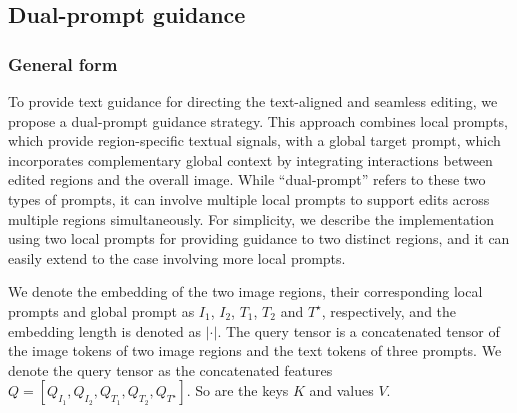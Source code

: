 \documentclass{article}
\begin{document}
\subsection{Dual-prompt guidance}
\label{sec:dualprompt}

\subsubsection{General form}
To provide text guidance for directing the text-aligned and seamless editing, we propose a dual-prompt guidance strategy. This approach combines local prompts, which provide region-specific textual signals, with a global target prompt, which incorporates complementary global context by integrating interactions between edited regions and the overall image. While ``dual-prompt'' refers to these two types of prompts, it can involve multiple local prompts to support edits across multiple regions simultaneously. For simplicity, we describe the implementation using two local prompts for providing guidance to two distinct regions, and it can easily extend to the case involving more local prompts.

We denote the embedding of the two image regions, their corresponding local prompts and global prompt  as $I_1$,  $I_2$,  $T_1$, $T_2$ and $T^\star$, respectively, and the embedding length is denoted as $|\cdot|$. The query tensor is a concatenated tensor of the image tokens of two image regions and the text tokens of three prompts. We denote the query tensor as the concatenated features $ Q= [Q_{I_1}, Q_{I_2}, Q_{T_1}, Q_{T_2}, Q_{T^{\star}}]$. So are the keys $K$ and values $V$. 
\end{document}
